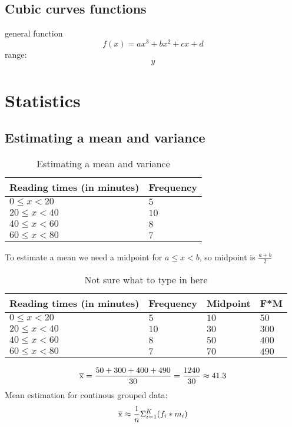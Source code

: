\documentclass{article}
\begin{document}
\subsection{Cubic curves functions}
general function
\begin{equation}
  f(x) = ax^3 + bx^2 + cx + d
\end{equation}
range:
\begin{equation}
  y
\end{equation}

\section{Statistics}
\subsection{Estimating a mean and variance}
\begin{table}[htbp]
\centering
\begin{tabular}{|l|l|}
\hline
\textbf{Reading times (in minutes)} & \textbf{Frequency} \\
\hline
$0 \leqslant x < 20$ & $5$ \\
\hline
$20 \leqslant x < 40$ & $10$ \\
\hline
$40 \leqslant x < 60$ & $8$ \\
\hline
$60 \leqslant x < 80$ & $7$ \\
\hline
\end{tabular}
\caption{Estimating a mean and variance}
\label{tab:estimating_a_mean_and_variance}
\end{table}
To estimate a mean we need a midpoint for $a \leqslant x < b$, so midpoint is $\frac{a+b}{2}$
\begin{table}[htbp]
\centering
\begin{tabular}{|l|l|l|l|}
\hline
\textbf{Reading times (in minutes)} & \textbf{Frequency} & \textbf{Midpoint} & \textbf{F*M} \\
\hline
$0 \leqslant x < 20$ & $5$ & $10$ & $50$ \\
\hline
$20 \leqslant x < 40$ & $10$ & $30$ & $300$ \\
\hline
$40 \leqslant x < 60$ & $8$ & $50$ & $400$ \\
\hline
$60 \leqslant x < 80$ & $7$ & $70$ & $490$ \\
\hline
\end{tabular}
\caption{Not sure what to type in here}
\label{tab:estimating_a_mean_and_variance_2}
\end{table}
\begin{equation}
  \overline{\rm x} = \frac{50+300+400+490}{30} = \frac{1240}{30} \approx 41.3
\end{equation}
Mean estimation for continous grouped data:
\begin{equation}
  \overline{\rm x} \approx \frac{1}{n}\Sigma^K_{i=1}(f_i * m_i)
\end{equation}
\end{document}
